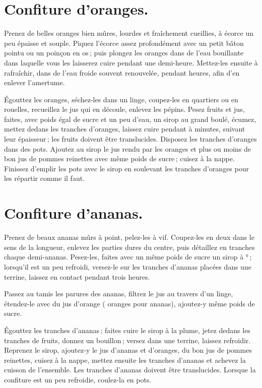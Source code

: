 \section*{\centering Confiture d’oranges.}
{}

Prenez de belles oranges bien mûres, lourdes et fraîchement cueillies, à écorce
un peu épaisse et souple. Piquez l'écorce assez profondément avec un petit
bâton pointu ou un poinçon en os ; puis plongez les oranges dans de l'eau
bouillante dans laquelle vous les laisserez cuire pendant une demi-heure.
Mettez-les ensuite à rafraîchir, dans de l'eau froide souvent renouvelée,
pendant {\mmm} heures, afin d'en enlever l’amertume.

Égouttez les oranges, séchez-les dans un linge, coupez-les en quartiers ou en
rouelles, recueillez le jus qui en découle, enlevez les pépins. Pesez fruits et
jus, faites, avec poids égal de sucre et un peu d'eau, un sirop au grand boulé,
écumez, mettez dedans les tranches d'oranges, laissez cuire pendant
{\mmm} à {\mmm} minutes, suivant leur épaisseur ; les fruits doivent
être translucides. Disposez les tranches d'oranges dans des pots. Ajoutez au
sirop le jus rendu par les oranges et plus ou moins de bon jus de pommes
reinettes avec même poids de sucre ; cuisez à la nappe. Finissez d'emplir les
pots avec le sirop en soulevant les tranches d’oranges pour les répartir comme
il faut.

\section*{\centering Confiture d’ananas.}
{}

Prenez de beaux ananas mûrs à point, pelez-les à vif. Coupez-les en deux dans
le sens de la longueur, enlevez les parties dures du centre, puis détaillez en
tranches chaque demi-ananas. Pesez-les, faites avec un même poids de sucre un
sirop à {\mmm}° ; lorsqu'il est un peu refroidi, versez-le sur les
tranches d'ananas placées dans une terrine, laissez en contact pendant trois
heures.

Passez au tamis les parures des ananas, filtrez le jus au travers d'un linge,
étendez-le avec du jus d'orange ({\mmm} oranges pour {\mmm} ananas),
ajoutez-y même poids de sucre.

Égouttez les tranches d'ananas ; faites cuire le sirop à la plume, jetez dedans
les tranches de fruits, donnez un bouillon ; versez dans une terrine, laissez
refroidir. Reprenez le sirop, ajoutez‑y le jus d'ananas et d'oranges, du bon
jus de pommes reinettes, cuisez à la nappe, mettez ensuite les tranches
d'ananas et achevez la cuisson de l’ensemble. Les tranches d'ananas doivent
être translucides. Lorsque la confiture est un peu refroidie, coulez-la en
pots.

